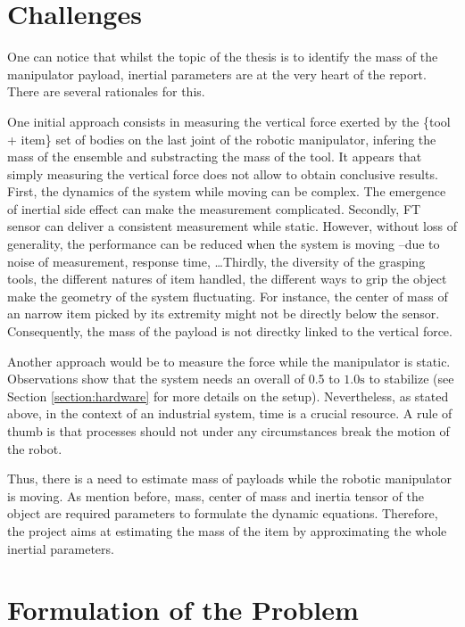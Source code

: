 \documentclass[/home/francois/latex/report/main.tex]{subfiles}
\begin{document}
\section{Challenges}

One can notice that whilst the topic of the thesis is to identify the mass of the manipulator payload, inertial parameters are at the very heart of the report. There are several rationales for this.

One initial approach consists in measuring the vertical force exerted by the \{tool + item\} set of bodies on the last joint of the robotic manipulator, infering the mass of the ensemble and substracting the mass of the tool. It appears that simply measuring the vertical force does not allow to obtain conclusive results. First, the dynamics of the system while moving can be complex. The emergence of inertial side effect can make the measurement complicated. Secondly, \ac{FT} sensor can deliver a consistent measurement while static. However, without loss of generality, the performance can be reduced when the system is moving –due to noise of measurement, response time, \ldots Thirdly, the diversity of the grasping tools, the different natures of item handled, the different ways to grip the object make the geometry of the system fluctuating. For instance, the center of mass of an narrow item picked by its extremity might not be directly below the sensor. Consequently, the mass of the payload is not directky linked to the vertical force.

Another approach would be to measure the force while the manipulator is static. Observations show that the system needs an overall of 0.5 to $ 1.0 \si{\second}$ to stabilize (see Section \ref{section:hardware} for more details on the setup). Nevertheless, as stated above, in the context of an industrial system, time is a crucial resource. A rule of thumb is that processes should not under any circumstances break the motion of the robot.

Thus, there is a need to estimate mass of payloads while the robotic manipulator is moving. As mention before, mass, center of mass and inertia tensor of the object are required parameters to formulate the dynamic equations. Therefore, the project aims at estimating the mass of the item by approximating the whole inertial parameters.


\section{Formulation of the Problem}
\end{document}
